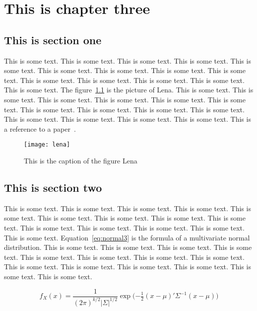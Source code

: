 \chapter{This is chapter three}


\section{This is section one}

This is some text. This is some text. This is some text. This is some text. This is some text. This is some text. This is some text. 
This is some text. This is some text. This is some text. This is some text. This is some text. This is some text. This is some text. 
The figure~\ref{fig:lena3} is the picture of Lena.
This is some text. This is some text. This is some text. This is some text. This is some text. This is some text. This is some text. 
This is some text. This is some text. This is some text. This is some text. This is some text. This is some text. This is some text. 
This is a reference to a paper~\cite{Garcia_2008_CVGPU}.

\begin{figure}[htbp]
    \centering
    \texttt{[image: lena]}
    \caption{This is the caption of the figure Lena}
    \label{fig:lena3}
\end{figure}


\section{This is section two}

This is some text. This is some text. This is some text. This is some text. This is some text. This is some text. This is some text. 
This is some text. This is some text. This is some text. This is some text. This is some text. This is some text. This is some text. 
Equation~\ref{eq:normal3} is the formula of a multivariate normal distribution.
This is some text. This is some text. This is some text. This is some text. This is some text. This is some text. This is some text. 
This is some text. This is some text. This is some text. This is some text. This is some text. This is some text. This is some text. 

\begin{equation}
    f_X(x) = \frac{1}{ (2\pi)^{k/2}|\Sigma|^{1/2} } \exp\!\Big( {-\tfrac{1}{2}}(x-\mu)'\Sigma^{-1}(x-\mu) \Big)
    \label{eq:normal3}
\end{equation}



